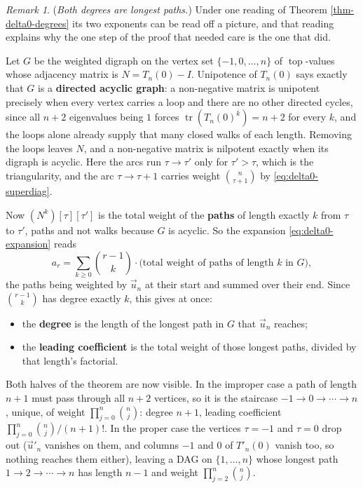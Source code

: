 \documentclass[11pt, a4paper, abstract=yes]{scrartcl}
\theoremstyle{definition}
\theoremstyle{remark}
\newtheorem{remark}[definition]{Remark}
\theoremstyle{plain}
\newcommand{\tp}{\operatorname{top}}
\begin{document}
\begin{remark}
(\emph{Both degrees are longest paths.}) Under one reading of Theorem \ref{thm-delta0-degrees} its two
exponents can be read off a picture, and that reading explains why the one step of the proof that
needed care is the one that did.

Let \(G\) be the weighted digraph on the vertex set \(\lbrace-1,0,\dots,n\rbrace\) of \(\tp\)-values
whose adjacency matrix is \(N=T_n(0)-I\). Unipotence of \(T_n(0)\) says exactly that \(G\) is a \textbf{directed
acyclic graph}: a non-negative matrix is unipotent precisely when every vertex carries a loop and
there are no other directed cycles, since all \(n+2\) eigenvalues being \(1\) forces
\(\operatorname{tr}(T_n(0)^k)=n+2\) for every \(k\), and the loops alone already supply that many closed
walks of each length. Removing the loops leaves \(N\), and a non-negative matrix is nilpotent exactly
when its digraph is acyclic. Here the arcs run \(\tau\to\tau'\) only for \(\tau'>\tau\), which is the
triangularity, and the arc \(\tau\to\tau+1\) carries weight \(\binom n{\tau+1}\) by
\eqref{eq:delta0-superdiag}.

Now \((N^k)[\tau][\tau']\) is the total weight of the \textbf{paths} of length exactly \(k\) from \(\tau\) to
\(\tau'\), paths and not walks because \(G\) is acyclic. So the expansion
\eqref{eq:delta0-expansion} reads
\begin{equation}\label{eq:delta0-paths}
  a_r=\sum_{k\ge0}\binom{r-1}k\cdot\bigl(\text{total weight of paths of length }k\text{ in }G\bigr),
\end{equation}
the paths being weighted by \(\vec u_n\) at their start and summed over their end. Since
\(\binom{r-1}k\) has degree exactly \(k\), this gives at once:

\begin{itemize}
\item the \textbf{\textbf{degree}} is the length of the longest path in \(G\) that \(\vec u_n\) reaches;
\item the \textbf{\textbf{leading coefficient}} is the total weight of those longest paths, divided by that length's
factorial.
\end{itemize}

Both halves of the theorem are now visible. In the improper case a path of length \(n+1\) must pass
through all \(n+2\) vertices, so it is the staircase \(-1\to0\to\cdots\to n\), unique, of weight
\(\prod_{j=0}^n\binom nj\): degree \(n+1\), leading coefficient
\(\prod_{j=0}^n\binom nj\big/(n+1)!\). In the proper case the vertices \(\tau=-1\) and \(\tau=0\) drop
out (\(\vec u'_n\) vanishes on them, and columns \(-1\) and \(0\) of \(T'_n(0)\) vanish too, so nothing
reaches them either), leaving a DAG on \(\lbrace1,\dots,n\rbrace\) whose longest path
\(1\to2\to\cdots\to n\) has length \(n-1\) and weight \(\prod_{j=2}^n\binom nj\).


\end{remark}
\end{document}
